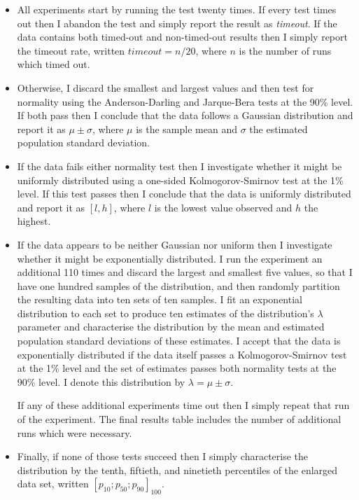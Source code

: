 \begin{itemize}
\item All experiments start by running the test twenty times.  If
  every test times out then I abandon the test and simply report the
  result as \textit{timeout}.  If the data contains both timed-out and
  non-timed-out results then I simply report the timeout rate, written
  $timeout = n/20$, where $n$ is the number of runs which timed out.
\item Otherwise, I discard the smallest and largest values and then
  test for normality using the Anderson-Darling and Jarque-Bera
  tests at the 90\% level.  If both pass then I conclude that the
  data follows a Gaussian distribution and report it as $\mu \pm \sigma$,
  where $\mu$ is the sample mean and $\sigma$ the estimated population
  standard deviation.
\item If the data fails either normality test then I investigate
  whether it might be uniformly distributed using a one-sided
  Kolmogorov-Smirnov test at the 1\% level.  If this test passes then I conclude that the
  data is uniformly distributed and report it as $[l, h]$, where $l$
  is the lowest value observed and $h$ the highest.
\item If the data appears to be neither Gaussian nor
  uniform then I investigate whether it might be exponentially
  distributed.  I run the experiment an additional 110 times and
  discard the largest and smallest five values, so that I have one
  hundred samples of the distribution, and then randomly partition the
  resulting data into ten sets of ten samples.  I fit an exponential
  distribution to each set to produce ten estimates of the
  distribution's $\lambda$ parameter and characterise the distribution by the mean and
  estimated population standard deviations of these estimates.  I
  accept that the data is exponentially distributed if the data itself
  passes a Kolmogorov-Smirnov test at the 1\% level and the set of
  estimates passes both normality tests at the 90\% level.  I denote
  this distribution by $\lambda = \mu \pm \sigma$.

  If any of these additional experiments time out then I simply repeat
  that run of the experiment.  The final results table includes the
  number of additional runs which were necessary.

\item Finally, if none of those tests succeed then I simply
  characterise the distribution by the tenth, fiftieth, and ninetieth
  percentiles of the enlarged data set, written $[p_{10}; p_{50};
    p_{90}]_{100}$.
\end{itemize}

